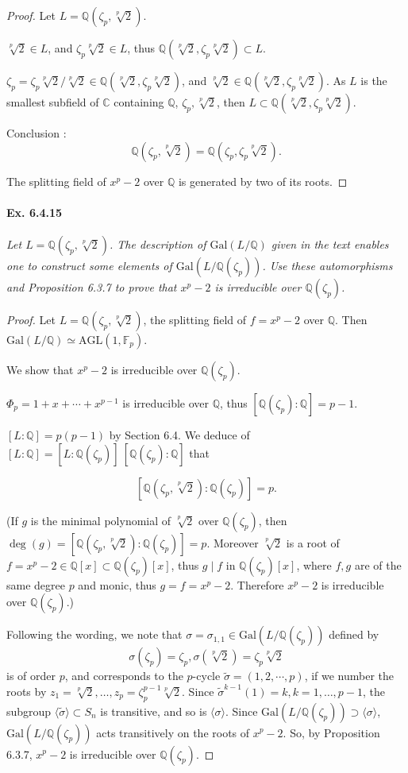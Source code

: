 \documentclass[11pt,a4paper]{article}
\newcommand{\Q}{\mathbb{Q}}
\newcommand{\C}{\mathbb{C}}
\newcommand{\F}{\mathbb{F}}
\newcommand{\Gal}{\mathrm{Gal}}
\begin{document}
\begin{proof}
Let $L = \Q(\zeta_p, \sqrt[p]{2})$.

$\sqrt[p]{2} \in L$, and $\zeta_p \sqrt[p]{2} \in L$, thus $\Q(\sqrt[p]{2},\zeta_p \sqrt[p]{2}) \subset L$.

$\zeta_p = \zeta_p \sqrt[p]{2}/\sqrt[p]{2} \in \Q(\sqrt[p]{2},\zeta_p \sqrt[p]{2})$, and $\sqrt[p]{2} \in \Q(\sqrt[p]{2},\zeta_p \sqrt[p]{2})$.
As $L$ is the smallest subfield of $\C$ containing $\Q$, $\zeta_p, \sqrt[p]{2} $, then  $L \subset \Q(\sqrt[p]{2},\zeta_p \sqrt[p]{2})$.

Conclusion : $$\Q(\zeta_p, \sqrt[p]{2}) = \Q(\zeta_p, \zeta_p\sqrt[p]{2}).$$

The splitting field of $x^p-2$ over $\Q$ is generated by two of its roots.
\end{proof}

\paragraph{Ex. 6.4.15}

{\it Let $L = \Q(\zeta_p,\sqrt[p]{2})$. The description of $\Gal(L/\Q)$ given in the text enables one to construct some elements of $\Gal(L/\Q(\zeta_p))$. Use these automorphisms and Proposition 6.3.7 to prove that $x^p - 2 $ is irreducible over $\Q(\zeta_p)$.
}

\begin{proof}
Let $L = \Q(\zeta_p,\sqrt[p]{2})$, the splitting field of $f = x^p-2$ over $\Q$. Then $\Gal(L/\Q) \simeq \mathrm{AGL}(1,\F_p)$.

We show that $x^p-2$ is irreducible over $\Q(\zeta_p)$.


$\Phi_p=1+x+\cdots+x^{p-1}$ is irreducible over $\Q$, thus $[\Q(\zeta_p):\Q] = p-1$.

$[L:\Q] = p(p-1)$ by Section 6.4.  We deduce of $[L:\Q] = [L:\Q(\zeta_p)]\ [\Q(\zeta_p):\Q]$ that

$$[\Q(\zeta_p,\sqrt[p]{2}) : \Q(\zeta_p)]  = p.$$

(If $g$ is the minimal polynomial of $\sqrt[p]{2}$ over $\Q(\zeta_p)$, then ${\deg(g) = [\Q(\zeta_p,\sqrt[p]{2}) : \Q(\zeta_p)] } = p$. Moreover $\sqrt[p]{2}$ is a root of $f=x^p-2\in \Q[x] \subset\Q(\zeta_p)[x]$, thus $g \mid f$ in $\Q(\zeta_p)[x]$, where $f,g$ are of the same degree  $p$ and monic, thus $g=f = x^p-2$. Therefore $x^p-2$ is irreducible over $\Q(\zeta_p)$.)

Following the wording, we note that $\sigma = \sigma_{1,1} \in \Gal(L/\Q(\zeta_p))$ defined by 
$$\sigma(\zeta_p) = \zeta_p, \sigma(\sqrt[p]{2}) = \zeta_p  \sqrt[p]{2}$$
is of order $p$, and corresponds to the $p$-cycle $\tilde{\sigma} = (1, 2, \cdots, p)$, if we number the roots by $z_1 = \sqrt[p]{2}, \ldots,  z_p= \zeta_p^{p-1} \sqrt[p]{2}$. Since $\tilde{\sigma}^{k-1}(1) = k, k = 1, \ldots, p-1$, the subgroup $\langle \tilde{\sigma} \rangle \subset S_n$ is transitive, and so is $\langle \sigma \rangle$. Since $\Gal(L/\Q(\zeta_p)) \supset \langle \sigma \rangle$, $\Gal(L/\Q(\zeta_p))$ acts transitively on the roots of $x^p - 2$. So, by Proposition 6.3.7, $x^p - 2$ is irreducible over $\Q(\zeta_p)$.

\end{proof}
\end{document}
